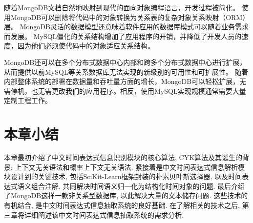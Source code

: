 随着MongoDB文档自然地映射到现代的面向对象编程语言，开发过程被简化。
使用MongoDB可以删除将代码中的对象转换为关系表的复杂对象关系映射（ORM）层。
MongoDB灵活的数据模型还意味着软件应用的数据库模式可以随着业务需求而发展。
MySQL僵化的关系结构增加了应用程序的开销，并降低了开发人员的速度，因为他们必须使代码中的对象适应关系结构。

MongoDB还可以在多个分布式数据中心内部和跨多个分布式数据中心进行扩展，从而提供以前MySQL等关系数据库无法实现的新级别的可用性和可扩展性。
随着内部整体系统的部署在数据量和吞吐量方面的增长，MongoDB可以轻松扩展，无需停机，也无需更改我们的应用程序。相反，使用MySQL实现规模通常需要大量定制工程工作。

\section{本章小结}

本章最初介绍了中文时间表达式信息识别模块的核心算法, CYK算法及其诞生的背景: 上下文无关语法和概率上下文无关语法. 
紧接着是中文时间表达式信息解析模块设计到的关键技术, 包括SciKit-Learn框架封装的朴素贝叶斯选择器, 以及时间表达式语义组合注解, 共同解决时间语义归一化为结构化时间对象的问题.
最后介绍了MongoDB这样一款非关系型数据库, 以此解决大量的文本储存问题. 这些技术的有机结合, 是中文时间表达式信息抽取系统的良好基础.
在了解相关的技术之后, 第三章将详细阐述该中文时间表达式信息抽取系统的需求分析.
